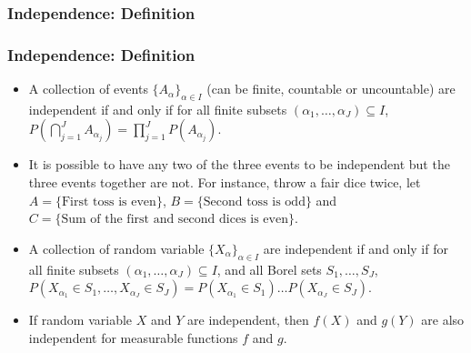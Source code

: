 \documentclass[handout]{beamer}
\begin{document}
\subsubsection{Independence: Definition}
\frame
{
  \frametitle{Independence: Definition}

   \begin{itemize}

             \item<1->  A collection of events $\{A_{\alpha}\}_{\alpha\in I}$ (can be finite, countable or uncountable) are independent if and only if for all finite subsets $(\alpha_1, \ldots, \alpha_J)\subseteq I$, $P(\bigcap_{j=1}^J A_{\alpha_j})=\prod_{j=1}^J P(A_{\alpha_j})$.
             
                     \item<2->[-] It is possible to have any two of the three events to be independent but the three events together are not. For instance, throw a fair dice twice, let $A=\{\text{First toss is even}\}$, $B=\{\text{Second toss is odd}\}$ and $C=\{\text{Sum of the first and second dices is even}\}$. 
           
              \item<3->  A collection of random variable $\{X_{\alpha}\}_{\alpha\in I}$ are independent if and only if for all finite subsets $(\alpha_1, \ldots, \alpha_J)\subseteq I$, and all Borel sets $S_1, \ldots, S_J$, $P(X_{\alpha_1}\in S_1, \ldots, X_{\alpha_J}\in S_J)= P(X_{\alpha_1}\in S_1)\ldots P( X_{\alpha_J}\in S_J) $. 
                                       
                                
              \item<4->  If random variable $X$ and $Y$ are independent, then $f(X)$ and $g(Y)$ are also independent for measurable functions $f$ and $g$. 
              
                           
                 \end{itemize}
}
\end{document}
